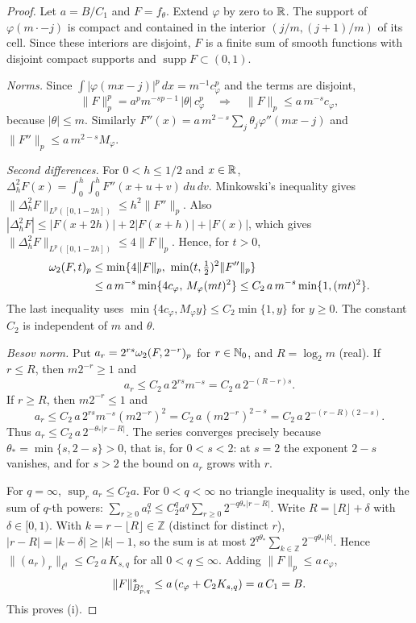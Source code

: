 \documentclass[11pt,a4paper]{article}
\begin{document}
\begin{proof}
Let $a=B/C_1$ and $F=f_\theta$. Extend $\varphi$ by zero to $\mathbb R$. The support of $\varphi(m\cdot-j)$ is compact and contained in the interior $(j/m,(j+1)/m)$ of its cell. Since these interiors are disjoint, $F$ is a finite sum of smooth functions with disjoint compact supports and $\operatorname{supp}F\subset(0,1)$.

\emph{Norms.} Since $\int|\varphi(mx-j)|^p\,dx=m^{-1}c_\varphi^p$ and the terms are disjoint,
\[
\|F\|_p^p=a^pm^{-sp-1}\,|\theta|\,c_\varphi^p
\quad\Longrightarrow\quad \|F\|_p\le a\,m^{-s}c_\varphi,
\]
because $|\theta|\le m$. Similarly $F''(x)=a\,m^{2-s}\sum_j\theta_j\varphi''(mx-j)$ and $\|F''\|_p\le a\,m^{2-s}M_\varphi$.

\emph{Second differences.} For $0<h\le1/2$ and $x\in\mathbb R$, $\Delta_h^2F(x)=\int_0^h\!\int_0^h F''(x+u+v)\,du\,dv$. Minkowski's inequality gives $\|\Delta_h^2F\|_{L^p([0,1-2h])}\le h^2\|F''\|_p$. Also $|\Delta_h^2F|\le|F(x+2h)|+2|F(x+h)|+|F(x)|$, which gives $\|\Delta_h^2F\|_{L^p([0,1-2h])}\le4\|F\|_p$. Hence, for $t>0$,
\begin{align*}
\omega_2(F,t)_{p}&\le\min\{4\|F\|_p,\ \min(t,\tfrac12)^2\|F''\|_p\}\\
&\le a\,m^{-s}\min\{4c_\varphi,\,M_\varphi(mt)^2\}\le C_2\,a\,m^{-s}\min\{1,(mt)^2\}.
\end{align*}
The last inequality uses $\min\{4c_\varphi,M_\varphi y\}\le C_2\min\{1,y\}$ for $y\ge0$. The constant $C_2$ is independent of $m$ and $\theta$.

\emph{Besov norm.} Put $a_r=2^{rs}\omega_2(F,2^{-r})_{p}$ for $r\in\mathbb N_0$, and $R=\log_2 m$ (real). If $r\le R$, then $m2^{-r}\ge1$ and
\[
a_r\le C_2\,a\,2^{rs}m^{-s}=C_2\,a\,2^{-(R-r)s}.
\]
If $r\ge R$, then $m2^{-r}\le1$ and
\[
a_r\le C_2\,a\,2^{rs}m^{-s}(m2^{-r})^2=C_2\,a\,(m2^{-r})^{2-s}=C_2\,a\,2^{-(r-R)(2-s)}.
\]
Thus $a_r\le C_2\,a\,2^{-\theta_*|r-R|}$. The series converges precisely because $\theta_*=\min\{s,2-s\}>0$, that is, for $0<s<2$: at $s=2$ the exponent $2-s$ vanishes, and for $s>2$ the bound on $a_r$ grows with $r$.

For $q=\infty$, $\sup_r a_r\le C_2a$. For $0<q<\infty$ no triangle inequality is used, only the sum of $q$-th powers: $\sum_{r\ge0}a_r^q\le C_2^qa^q\sum_{r\ge0}2^{-q\theta_*|r-R|}$. Write $R=\lfloor R\rfloor+\delta$ with $\delta\in[0,1)$. With $k=r-\lfloor R\rfloor\in\mathbb Z$ (distinct for distinct $r$), $|r-R|=|k-\delta|\ge|k|-1$, so the sum is at most $2^{q\theta_*}\sum_{k\in\mathbb Z}2^{-q\theta_*|k|}$. Hence $\|(a_r)_r\|_{\ell^q}\le C_2\,a\,K_{s,q}$ for all $0<q\le\infty$. Adding $\|F\|_p\le a\,c_\varphi$,
\[
\|F\|^*_{B^{s}_{p,q}}\le a\,(c_\varphi+C_2K_{s,q})=a\,C_1=B.
\]
This proves (i).


\end{proof}
\end{document}
